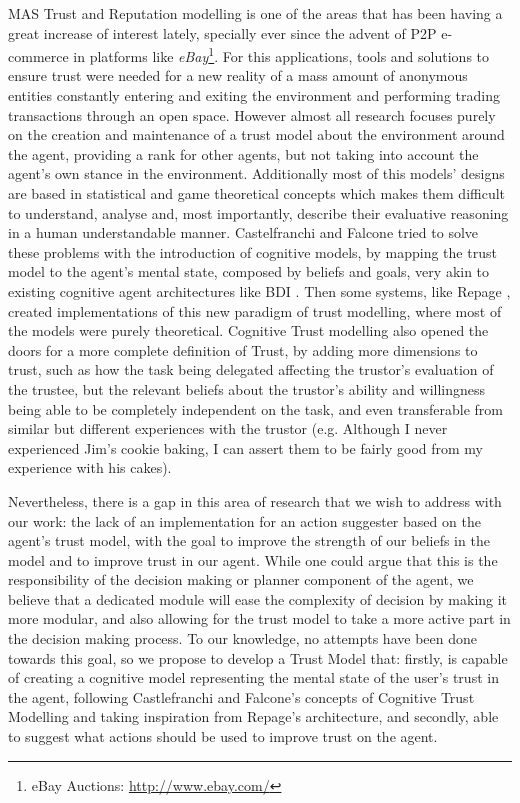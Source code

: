 \ac{MAS} Trust and Reputation modelling is one of the areas that has been having a great increase of interest lately, specially ever since the advent of \ac{P2P} e-commerce in platforms like \textit{eBay}\footnote{eBay Auctions: \url{http://www.ebay.com/}}. For this applications, tools and solutions to ensure trust were needed for a new reality of a mass amount of anonymous entities constantly entering and exiting the environment and performing trading transactions through an open space. However almost all research focuses purely on the creation and maintenance of a trust model about the environment around the agent, providing a rank for other agents, but not taking into account the agent's own stance in the environment. Additionally most of this models' designs are based in statistical and game theoretical concepts \cite{Granatyr2015} which makes them difficult to understand, analyse and, most importantly, describe their evaluative reasoning in a human understandable manner.
Castelfranchi and Falcone \cite{Castelfranchi1998} tried to solve these problems with the introduction of cognitive models, by mapping the trust model to the agent's mental state, composed by beliefs and goals, very akin to existing cognitive agent architectures like \ac{BDI} \cite{Rao1995}. Then some systems, like Repage \cite{Sabater2006}, created implementations of this new paradigm of trust modelling, where most of the models were purely theoretical. Cognitive Trust modelling also opened the doors for a more complete definition of Trust, by adding more dimensions to trust, such as how the task being delegated affecting the trustor's evaluation of the trustee, but the relevant beliefs about the trustor's ability and willingness being able to be completely independent on the task, and even transferable from similar but different experiences with the trustor (e.g. Although I never experienced Jim's cookie baking, I can assert them to be fairly good from my experience with his cakes).

Nevertheless, there is a gap in this area of research that we wish to address with our work: the lack of an implementation for an action suggester based on the agent's trust model, with the goal to improve the strength of our beliefs in the model and to improve trust in our agent. While one could argue that this is the responsibility of the decision making or planner component of the agent, we believe that a dedicated module will ease the complexity of decision by making it more modular, and also allowing for the trust model to take a more active part in the decision making process. To our knowledge, no attempts have been done towards this goal, so we propose to develop a Trust Model that: firstly, is capable of creating a cognitive model representing the mental state of the user's trust in the agent, following Castlefranchi and Falcone's concepts of Cognitive Trust Modelling and taking inspiration from Repage's architecture, and secondly, able to suggest what actions should be used to improve trust on the agent.

